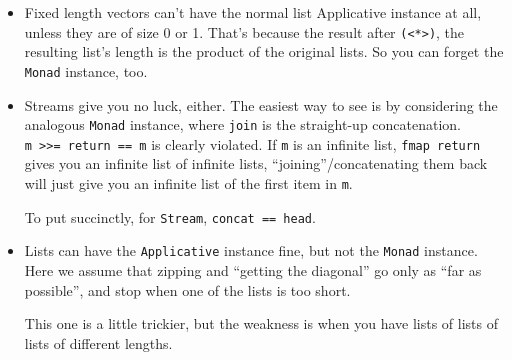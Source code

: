 \documentclass[]{article}
\newenvironment{Shaded}{}{}
\newcommand{\DecValTok}[1]{\textcolor[rgb]{0.25,0.63,0.44}{#1}}
\newcommand{\FunctionTok}[1]{\textcolor[rgb]{0.02,0.16,0.49}{#1}}
\newcommand{\KeywordTok}[1]{\textcolor[rgb]{0.00,0.44,0.13}{\textbf{#1}}}
\newcommand{\NormalTok}[1]{#1}
\newcommand{\OperatorTok}[1]{\textcolor[rgb]{0.40,0.40,0.40}{#1}}
\newcommand{\OtherTok}[1]{\textcolor[rgb]{0.00,0.44,0.13}{#1}}
\begin{document}
\begin{itemize}
\item
  Fixed length vectors can't have the normal list Applicative instance at all,
  unless they are of size 0 or 1. That's because the result after
  \texttt{(\textless{}*\textgreater{})}, the resulting list's length is the
  product of the original lists. So you can forget the \texttt{Monad} instance,
  too.
\item
  Streams give you no luck, either. The easiest way to see is by considering the
  analogous \texttt{Monad} instance, where \texttt{join} is the straight-up
  concatenation. \texttt{m\ \textgreater{}\textgreater{}=\ return\ ==\ m} is
  clearly violated. If \texttt{m} is an infinite list, \texttt{fmap\ return}
  gives you an infinite list of infinite lists, ``joining''/concatenating them
  back will just give you an infinite list of the first item in \texttt{m}.

  To put succinctly, for \texttt{Stream}, \texttt{concat\ ==\ head}.
\item
  Lists can have the \texttt{Applicative} instance fine, but not the
  \texttt{Monad} instance. Here we assume that zipping and ``getting the
  diagonal'' go only as ``far as possible'', and stop when one of the lists is
  too short.

  This one is a little trickier, but the weakness is when you have lists of
  lists of lists of different lengths.

\begin{Shaded}
\end{Shaded}


\end{itemize}
\end{document}

